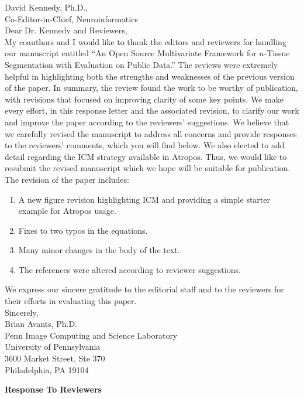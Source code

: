 \documentclass[11pt]{article}
\begin{document}
\noindent
David Kennedy, Ph.D.,\\
Co-Editor-in-Chief, Neuroinformatics\\

\noindent
Dear Dr. Kennedy and Reviewers,\\

\noindent
My coauthors and I would like to thank the editors and reviewers for
handling our manuscript entitled ``An Open Source Multivariate Framework for $n$-Tissue
  Segmentation with Evaluation on Public Data.''  The reviews were extremely helpful in highlighting both
the strengths and weaknesses of the previous version of the paper.  In
summary, the review found the work to be worthy of publication, with
revisions that focused on improving clarity of some key points. We make every effort, in this response letter and the
associated revision, to clarify our work and improve the paper
according to the reviewers' suggestions. We believe that we carefully
revised the manuscript to address all concerns and provide responses
to the reviewers' comments, which you will find below.   We
also elected to add detail regarding the ICM strategy
available in Atropos. Thus, we would
like to resubmit the revised manuscript which we hope will be suitable
for publication. \\

\noindent
The revision of the paper includes:
\begin{enumerate}
\item  A new figure revision highlighting ICM and providing a simple
  starter example for Atropos usage. 
\item Fixes to two typos in the equations. 
\item  Many minor changes in the body of the text.  
\item  The references were altered according to reviewer suggestions.
\end{enumerate}
We express our sincere gratitude to
the editorial staff and to the reviewers for their efforts in
evaluating this paper. \\

\noindent
Sincerely,\\

\noindent
Brian Avants, Ph.D.\\
Penn Image Computing and Science Laboratory \\ 
University of Pennsylvania\\
3600 Market Street, Ste 370\\
Philadelphia, PA 19104
\newpage
\begin{center}
\LARGE{{\bf Response To Reviewers}}
\end{center}
\end{document}
